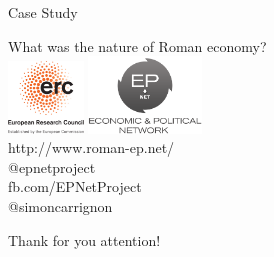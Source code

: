 \documentclass[12pt, handout=show,notes=show]{beamer}
\begin{document}
%	
%
\begin{frame}{Case Study}
	\begin{center}
		\Large
		What was the nature of Roman economy?\\
		\includegraphics[width=2cm]{images/LOGO-ERC.jpg} \hfil	\includegraphics[width=3cm]{images/epnetLogo.png}\\
		\vspace{1cm}
		\scriptsize
			http://www.roman-ep.net/\\
			@epnetproject\\
			fb.com/EPNetProject\\
			@simoncarrignon
	\end{center}


\end{frame}

\begin{frame}
    \Huge
    Thank for you attention!
\end{frame}
\end{document}
